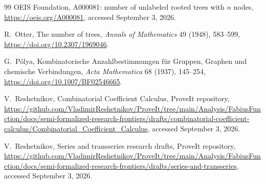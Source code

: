 \documentclass[11pt]{article}
\theoremstyle{definition}
\theoremstyle{remark}
\begin{document}
\begin{thebibliography}{99}
OEIS Foundation,
\newblock A000081: number of unlabeled rooted trees with $n$ nodes,
\newblock \url{https://oeis.org/A000081}, accessed September 3, 2026.

R.~Otter,
\newblock The number of trees,
\newblock \emph{Annals of Mathematics} 49 (1948), 583--599,
\newblock \url{https://doi.org/10.2307/1969046}.

G.~P\'olya,
\newblock Kombinatorische Anzahlbestimmungen f\"ur Gruppen, Graphen und
chemische Verbindungen,
\newblock \emph{Acta Mathematica} 68 (1937), 145--254,
\newblock \url{https://doi.org/10.1007/BF02546665}.

V.~Reshetnikov,
\newblock Combinatorial Coefficient Calculus,
\newblock ProveIt repository,
\newblock \url{https://github.com/VladimirReshetnikov/ProveIt/tree/main/Analysis/FabiusFunction/docs/semi-formalized-research-frontiers/drafts/combinatorial-coefficient-calculus/Combinatorial_Coefficient_Calculus},
accessed September 3, 2026.

V.~Reshetnikov,
\newblock Series and transseries research drafts,
\newblock ProveIt repository,
\newblock \url{https://github.com/VladimirReshetnikov/ProveIt/tree/main/Analysis/FabiusFunction/docs/semi-formalized-research-frontiers/drafts/series-and-transseries},
accessed September 3, 2026.

\end{thebibliography}
\end{document}
